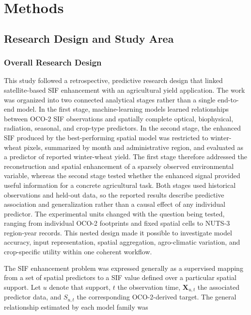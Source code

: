 \chapter{Methods\label{cha:chapter5}}

\section{Research Design and Study Area\label{sec:research_methods}}

\subsection{Overall Research Design}

This study followed a retrospective, predictive research design that linked satellite-based SIF enhancement with an agricultural yield application. The work was organized into two connected analytical stages rather than a single end-to-end model. In the first stage, machine-learning models learned relationships between OCO-2 SIF observations and spatially complete optical, biophysical, radiation, seasonal, and crop-type predictors. In the second stage, the enhanced SIF produced by the best-performing spatial model was restricted to winter-wheat pixels, summarized by month and administrative region, and evaluated as a predictor of reported winter-wheat yield. The first stage therefore addressed the reconstruction and spatial enhancement of a sparsely observed environmental variable, whereas the second stage tested whether the enhanced signal provided useful information for a concrete agricultural task. Both stages used historical observations and held-out data, so the reported results describe predictive association and generalization rather than a causal effect of any individual predictor. The experimental units changed with the question being tested, ranging from individual OCO-2 footprints and fixed spatial cells to NUTS-3 region-year records. This nested design made it possible to investigate model accuracy, input representation, spatial aggregation, agro-climatic variation, and crop-specific utility within one coherent workflow.

The SIF enhancement problem was expressed generally as a supervised mapping from a set of spatial predictors to a SIF value defined over a particular spatial support. Let $u$ denote that support, $t$ the observation time, $\mathbf{X}_{u,t}$ the associated predictor data, and $S_{u,t}$ the corresponding OCO-2-derived target. The general relationship estimated by each model family was

